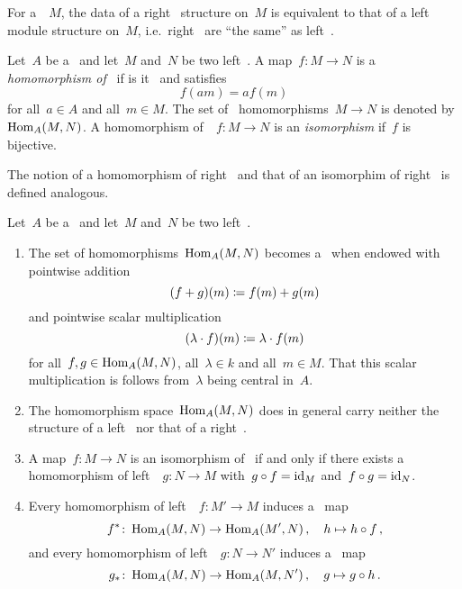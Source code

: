 \begin{remark}
  For a~{\module{$\kf$}}~$M$, the data of a right~{} structure on~$M$ is equivalent to that of a left~{} module structure on~$M$, i.e.\ right~{} are \enquote{the same} as left~{}.
\end{remark}


\begin{definition}
  Let~$A$ be a~{\kalg} and let~$M$ and~$N$ be two left~{}.
  A map~$f \colon M \to N$ is a \emph{homomorphism of~{}} if is it~{\klin} and satisfies
  \[
      f(am)
    = a f(m)
  \]
  for all~$a \in A$ and all~$m \in M$.
  The set of~{} homomorphisms~$M \to N$ is denoted by~$\operatorname{Hom}_A(M,N)$.
  A homomorphism of~{}~$f \colon M \to N$ is an \emph{isomorphism} if~$f$ is bijective.
  
  The notion of a homomorphism of right~{} and that of an isomorphim of right~{} is defined analogous.
\end{definition}


\begin{remark}
  Let~$A$ be a~{\kalg} and let~$M$ and~$N$ be two left~{}.
  \begin{enumerate}
    \item
      The set of homomorphisms~$\operatorname{Hom}_A(M,N)$ becomes a~{\module{$\kf$}} when endowed with pointwise addition
      \[
                  (f + g)(m)
        \coloneqq  f(m) + g(m)
      \]
      and pointwise scalar multiplication
      \[
                  (\lambda \cdot f)(m)
        \coloneqq  \lambda \cdot f(m)
      \]
      for all~$f, g \in \operatorname{Hom}_A(M,N)$, all~$\lambda \in k$ and all~$m \in M$.
      That this scalar multiplication is {\welldef} follows from~$\lambda$ being central in~$A$.
    \item
      The homomorphism space~$\operatorname{Hom}_A(M,N)$ does in general carry neither the structure of a left~{} nor that of a right~{}.
    \item
      A map~$f \colon M \to N$ is an isomorphism of~{} if and only if there exists a homomorphism of left~{}~$g \colon N \to M$ with~$g \circ f = \operatorname{id}_M$ and~$f \circ g = \operatorname{id}_N$.
    \item
      Every homomorphism of left~{}~$f \colon M' \to M$ induces a~{\klin} map
      \[
                f^*
        \colon  \operatorname{Hom}_A(M, N)
        \to     \operatorname{Hom}_A(M', N) \,,
        \quad   h
        \mapsto h \circ f \,,
      \]
      and every homomorphism of left~{}~$g \colon N \to N'$ induces a~{\klin} map
      \[
                g_*
        \colon  \operatorname{Hom}_A(M, N)
        \to     \operatorname{Hom}_A(M, N') \,,
        \quad   g
        \mapsto g \circ h \,.
      \]
  \end{enumerate}
\end{remark}



